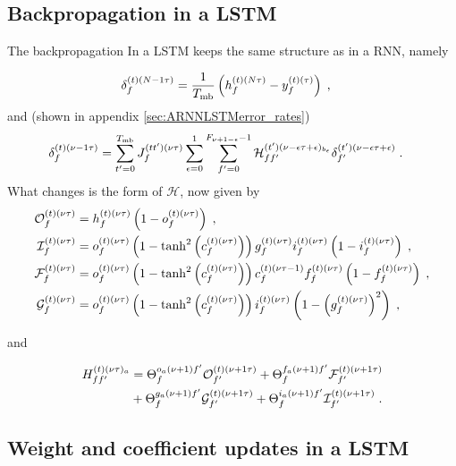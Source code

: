 \subsection{Backpropagation in a LSTM} \label{sec:appendbackproplstm}


The backpropagation In a LSTM keeps the same structure as in a RNN, namely 

\begin{align}
\delta^{(t)(N-1\tau)}_f&= \frac{1}{T_{{\rm mb}}}\left(h_{f}^{(t)(N\tau)}-y_f^{(t)(\tau)}\right)\;,
\end{align}
and (shown in appendix \ref{sec:ARNNLSTMerror_rates})
\begin{align}
\delta^{(t)(\nu-1\tau)}_f&= 
%
\sum_{t'=0}^{T_{{\rm mb}}}J^{(tt')(\nu\tau)}_f\sum_{\epsilon=0}^{1}\sum_{f'=0}^{F_{\nu+1-\epsilon}-1}
%
\mathcal{H}^{(t')(\nu-\epsilon\tau+\epsilon)_{b_\epsilon}}_{ff'}\delta^{(t')(\nu-\epsilon\tau+\epsilon)}_{f'}\;.
\end{align}
What changes is the form of $\mathcal{H}$, now given by
\begin{align}
\mathcal{O}^{(t)(\nu\tau)}_{f}&=h^{(t)(\nu\tau)}_{f}
%
\left(1-o^{(t)(\nu\tau)}_{f}\right)\;,\notag\\
%
\mathcal{I}^{(t)(\nu\tau)}_{f}&=o^{(t)(\nu\tau)}_{f}\left(1-\tanh^2\left(c^{(t)(\nu\tau)}_{f}\right)
%
\right)g^{(t)(\nu\tau)}_{f} i^{(t)(\nu\tau)}_{f}\left(1-i^{(t)(\nu\tau)}_{f}\right)\;,\notag\\
%
\mathcal{F}^{(t)(\nu\tau)}_{f}&=o^{(t)(\nu\tau)}_{f}\left(1-\tanh^2\left(c^{(t)(\nu\tau)}_{f}\right)
%
\right)c^{(t)(\nu\tau-1)}_{f} f^{(t)(\nu\tau)}_{f}\left(1-f^{(t)(\nu\tau)}_{f}\right)\;,\notag\\
%
\mathcal{G}^{(t)(\nu\tau)}_{f}&=o^{(t)(\nu\tau)}_{f}\left(1-\tanh^2\left(c^{(t)(\nu\tau)}_{f}\right)
%
\right)i^{(t)(\nu\tau)}_{f}\left(1-\left(g^{(t)(\nu\tau)}_{f}\right)^2\right)\;,
\end{align}

and

\begin{align}
H^{(t)(\nu\tau)_a}_{ff'}&=\Theta^{o_a(\nu+1)f'}_{f}\mathcal{O}^{(t)(\nu+1\tau)}_{f'}
%
+\Theta^{f_a(\nu+1)f'}_{f}\mathcal{F}^{(t)(\nu+1\tau)}_{f'}\notag\\
%
&+\Theta^{g_a(\nu+1)f'}_{f}\mathcal{G}^{(t)(\nu+1\tau)}_{f'}
%
+\Theta^{i_a(\nu+1)f'}_{f}\mathcal{I}^{(t)(\nu+1\tau)}_{f'}\;.
\end{align}


\subsection{Weight and coefficient updates in a LSTM}

